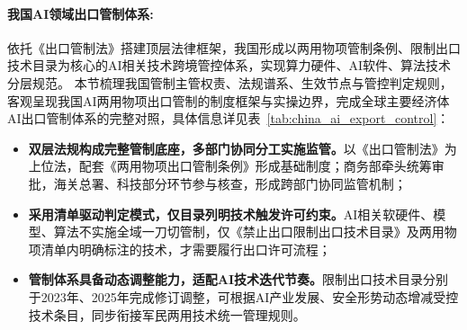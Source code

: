 \paragraph{我国AI领域出口管制体系:}
依托《出口管制法》搭建顶层法律框架，我国形成以两用物项管制条例、限制出口技术目录为核心的AI相关技术跨境管控体系，实现算力硬件、AI软件、算法技术分层规范。
本节梳理我国管制主管权责、法规谱系、生效节点与管控判定规则，客观呈现我国AI两用物项出口管制的制度框架与实操边界，完成全球主要经济体AI出口管制体系的完整对照，具体信息详见表~\ref{tab:china_ai_export_control}：

\begin{itemize}[tabitem]
    \item \textbf{双层法规构成完整管制底座，多部门协同分工实施监管。}以《出口管制法》为上位法，配套《两用物项出口管制条例》形成基础制度；商务部牵头统筹审批，海关总署、科技部分环节参与核查，形成跨部门协同监管机制；
    \item \textbf{采用清单驱动判定模式，仅目录列明技术触发许可约束。}AI相关软硬件、模型、算法不实施全域一刀切管制，仅《禁止出口限制出口技术目录》及两用物项清单内明确标注的技术，才需要履行出口许可流程；
    \item \textbf{管制体系具备动态调整能力，适配AI技术迭代节奏。}限制出口技术目录分别于2023年、2025年完成修订调整，可根据AI产业发展、安全形势动态增减受控技术条目，同步衔接军民两用技术统一管理规则。
\end{itemize}


\begingroup
\enlargethispage{1cm}
\footnotesize
\centering


